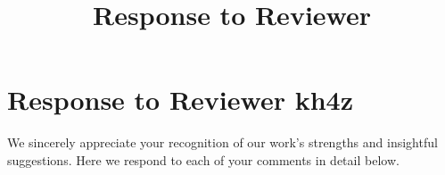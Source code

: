 \documentclass{article}
\title{Response to Reviewer}
\begin{document}
\maketitle

\section{Response to Reviewer kh4z}\label{response-to-reviewer-kh4z}

We sincerely appreciate your recognition of our work's strengths and insightful suggestions. Here we respond to each of your comments in detail below.

\end{document}
